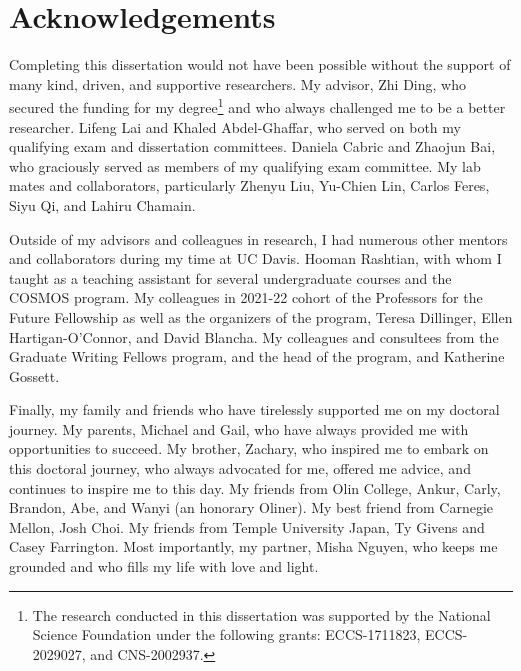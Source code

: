 \chapter*{Acknowledgements}

Completing this dissertation would not have been possible without the support of many kind, driven, and supportive researchers. My advisor, Zhi Ding, who secured the funding for my degree\footnote{The research conducted in this dissertation was supported by the National Science Foundation under the following grants: ECCS-1711823, ECCS-2029027, and CNS-2002937.} and who always challenged me to be a better researcher. Lifeng Lai and Khaled Abdel-Ghaffar, who served on both my qualifying exam and dissertation committees. Daniela Cabric and Zhaojun Bai, who graciously served as members of my qualifying exam committee. My lab mates and collaborators, particularly Zhenyu Liu, Yu-Chien Lin, Carlos Feres, Siyu Qi, and Lahiru Chamain.

Outside of my advisors and colleagues in research, I had numerous other mentors and collaborators during my time at UC Davis. Hooman Rashtian, with whom I taught as a teaching assistant for several undergraduate courses and the COSMOS program. My colleagues in 2021-22 cohort of the Professors for the Future Fellowship as well as the organizers of the program, Teresa Dillinger, Ellen Hartigan-O'Connor, and David Blancha. My colleagues and consultees from the Graduate Writing Fellows program, and the head of the program, and Katherine Gossett.

Finally, my family and friends who have tirelessly supported me on my doctoral journey. My parents, Michael and Gail, who have always provided me with opportunities to succeed. My brother, Zachary, who inspired me to embark on this doctoral journey, who always advocated for me, offered me advice, and continues to inspire me to this day. My friends from Olin College, Ankur, Carly, Brandon, Abe, and Wanyi (an honorary Oliner). My best friend from Carnegie Mellon, Josh Choi. My friends from Temple University Japan, Ty Givens and Casey Farrington. Most importantly, my partner, Misha Nguyen, who keeps me grounded and who fills my life with love and light.


